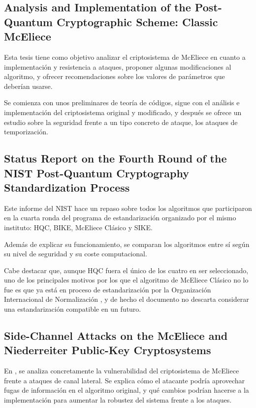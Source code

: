 \subsection{Analysis and Implementation of the Post-Quantum Cryptographic Scheme: Classic McEliece}

Esta tesis \autocite{implementation} tiene como objetivo analizar el criptosistema de McEliece en cuanto a implementación y resistencia a ataques, proponer algunas modificaciones al algoritmo, y ofrecer recomendaciones sobre los valores de parámetros que deberían usarse.

Se comienza con unos preliminares de teoría de códigos, sigue con el análisis e implementación del criptosistema original y modificado, y después se ofrece un estudio sobre la seguridad frente a un tipo concreto de ataque, los ataques de temporización.

\subsection{Status Report on the Fourth Round of the NIST Post-Quantum Cryptography Standardization Process}

Este informe del NIST \autocite{NIST8545} hace un repaso sobre todos los algoritmos que participaron en la cuarta ronda del programa de estandarización organizado por el mismo instituto: HQC, BIKE, McEliece Clásico y SIKE.

Además de explicar su funcionamiento, se comparan los algoritmos entre sí según su nivel de seguridad y su coste computacional.

Cabe destacar que, aunque HQC fuera el único de los cuatro en ser seleccionado, uno de los principales motivos por los que el algoritmo de McEliece Clásico no lo fue es que ya está en proceso de estandarización por la Organización Internacional de Normalización \autocite{isoMcEliece}, y de hecho el documento no descarta considerar una estandarización compatible en un futuro.

\subsection{Side-Channel Attacks on the McEliece and Niederreiter Public-Key Cryptosystems}

En \autocite{Avanzi2011}, se analiza concretamente la vulnerabilidad del criptosistema de McEliece frente a ataques de canal lateral. Se explica cómo el atacante podría aprovechar fugas de información en el algoritmo original, y qué cambios podrían hacerse a la implementación para aumentar la robustez del sistema frente a los ataques.

